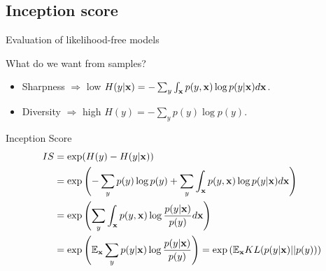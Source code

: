 \subsection{Inception score}
\begin{frame}{Evaluation of likelihood-free models}
		\begin{block}{What do we want from samples?}
		\begin{itemize}
			\item Sharpness $\Rightarrow$ low $H(y | \mathbf{x}) = - \sum_{y} \int_{\mathbf{x}} p(y, \mathbf{x}) \log p(y | \mathbf{x}) d\mathbf{x}$.
			\item Diversity $\Rightarrow$ high $H(y)  = - \sum_{y} p(y) \log p(y)$.
		\end{itemize}
	\end{block}
	\begin{block}{Inception Score}
		\vspace{-0.3cm}
		\footnotesize
		\begin{align*}
			IS &= \exp(H(y) - H(y | \mathbf{x})) \\ 
			&= \exp \left( - \sum_{y} p(y) \log p(y) + \sum_{y} \int_{\mathbf{x}} p(y, \mathbf{x}) \log p(y | \mathbf{x}) d\mathbf{x}\right) \\
			&= \exp \left( \sum_{y} \int_{\mathbf{x}} p(y, \mathbf{x}) \log \frac{p(y | \mathbf{x})}{p(y)} d\mathbf{x}\right) \\ 
			&= \exp \left( \mathbb{E}_{\mathbf{x}} \sum_{y} p(y | \mathbf{x}) \log \frac{p(y | \mathbf{x})}{p(y)} \right) = \exp \left( \mathbb{E}_{\mathbf{x}} KL(p(y | \mathbf{x}) || p(y)) \right)
		\end{align*}
	\end{block}
\end{frame}
